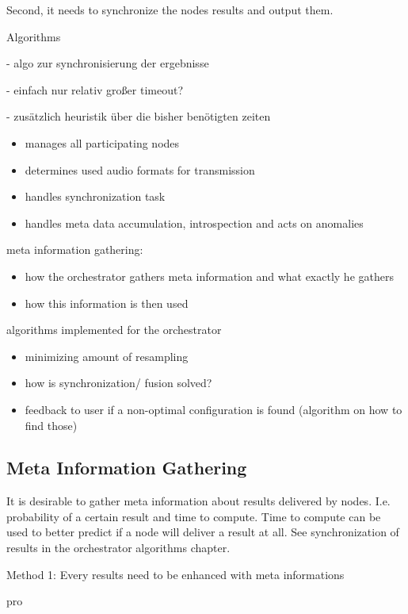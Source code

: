 Second, it needs to synchronize the nodes results and output them. 

Algorithms

- algo zur synchronisierung der ergebnisse 

- einfach nur relativ großer timeout?

- zusätzlich heuristik über die bisher benötigten zeiten


\begin{itemize}
	\item manages all participating nodes
	\item determines used audio formats for transmission
	\item handles synchronization task
	\item handles meta data accumulation, introspection and acts on anomalies
\end{itemize}

meta information gathering:

\begin{itemize}
	\item how the orchestrator gathers meta information and what exactly he gathers
	\item how this information is then used
\end{itemize}

algorithms implemented for the orchestrator

\begin{itemize}
	\item minimizing amount of resampling
	\item how is synchronization/ fusion solved?
	\item feedback to user if a non-optimal configuration is found (algorithm on how to find those)
\end{itemize}

\subsection{Meta Information Gathering}
It is desirable to gather meta information about results delivered by nodes. 
I.e. probability of a certain result and time to compute. 
Time to compute can be used to better predict if a node will deliver a result at all. 
See synchronization of results in the orchestrator algorithms chapter.

Method 1: Every results need to be enhanced with meta informations

pro


